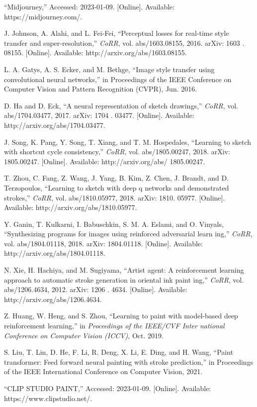 \documentclass[MIRU,submit,uplatex]{miru2023j}
\begin{document}
\begin{thebibliography}{10}%
“Midjourney,” Accessed: 2023-01-09. [Online]. Available: https://midjourney.com/.

\sloppy
J. Johnson, A. Alahi, and L. Fei-Fei, “Perceptual losses for real-time
style transfer and super-resolution,” \textit{CoRR}, vol. abs/1603.08155, 2016.
arXiv: 1603 . 08155. [Online]. Available: http://arxiv.org/abs/1603.08155.

L. A. Gatys, A. S. Ecker, and M. Bethge, “Image style transfer using
convolutional neural networks,” in Proceedings of the IEEE Conference
on Computer Vision and Pattern Recognition (CVPR), Jun. 2016.

\sloppy
D. Ha and D. Eck, “A neural representation of sketch drawings,” \textit{CoRR},
vol. abs/1704.03477, 2017. arXiv: 1704 . 03477. [Online]. Available:
http://arxiv.org/abs/1704.03477.

J. Song, K. Pang, Y. Song, T. Xiang, and T. M. Hospedales, “Learning
to sketch with shortcut cycle consistency,” \textit{CoRR}, vol. abs/1805.00247,
2018. arXiv: 1805.00247. [Online]. Available: http://arxiv.org/abs/
1805.00247.

T. Zhou, C. Fang, Z. Wang, J. Yang, B. Kim, Z. Chen, J. Brandt,
and D. Terzopoulos, “Learning to sketch with deep q networks and
demonstrated strokes,” \textit{CoRR}, vol. abs/1810.05977, 2018. arXiv: 1810.
05977. [Online]. Available: http://arxiv.org/abs/1810.05977.

Y. Ganin, T. Kulkarni, I. Babuschkin, S. M. A. Eslami, and O. Vinyals,
“Synthesizing programs for images using reinforced adversarial learn
ing,” \textit{CoRR}, vol. abs/1804.01118, 2018. arXiv: 1804.01118. [Online].
Available: http://arxiv.org/abs/1804.01118.

N. Xie, H. Hachiya, and M. Sugiyama, “Artist agent: A reinforcement
learning approach to automatic stroke generation in oriental ink paint
ing,” \textit{CoRR}, vol. abs/1206.4634, 2012. arXiv: 1206 . 4634. [Online].
Available: http://arxiv.org/abs/1206.4634.

Z. Huang, W. Heng, and S. Zhou, “Learning to paint with model-based
deep reinforcement learning,” in \textit{Proceedings of the IEEE/CVF Inter
national Conference on Computer Vision (ICCV)}, Oct. 2019.

S. Liu, T. Lin, D. He, F. Li, R. Deng, X. Li, E. Ding, and H. Wang,
“Paint transformer: Feed forward neural painting with stroke prediction,”
in Proceedings of the IEEE International Conference on Computer Vision, 2021.

“CLIP STUDIO PAINT,” Accessed: 2023-01-09. [Online]. Available: https://www.clipstudio.net/.


\end{thebibliography}
\end{document}

